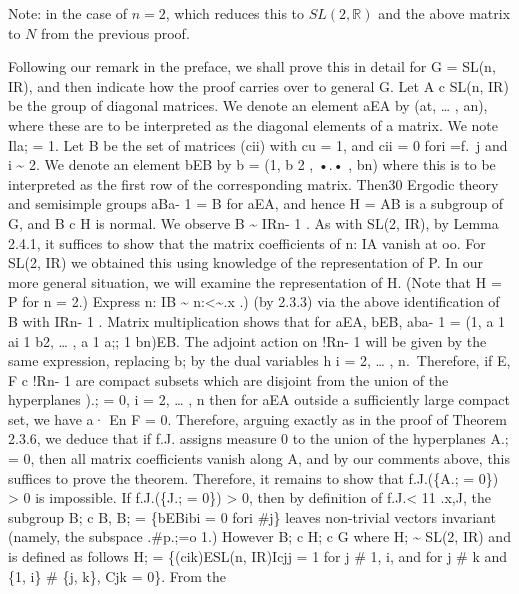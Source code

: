 \documentclass[
  12pt
]{article}
\theoremstyle{break}
\theoremstyle{plain}
\newcommand{\sltr}{\ensuremath{SL(2, \mathbb{R})}\xspace}
\begin{document}
  Note: in the case of $n = 2$, which reduces this to \sltr and the above matrix to $N$ from the previous proof.





   Following our remark in the preface, we shall
  prove this in detail for G = SL(n, IR), and then indicate how the proof
  carries over to general G. Let A c SL(n, IR) be the group of diagonal
  matrices. We denote an element aEA by (at, \ldots{} , an), where these
  are to be interpreted as the diagonal elements of a matrix. We note Ila;
  = 1. Let B be the set of matrices (cii) with cu = 1, and cii = 0 fori
  =f.~j and i \textasciitilde{} 2. We denote an element bEB by b = (1, b 2
  , •.• , bn) where this is to be interpreted as the first row of the
  corresponding matrix. Then30 Ergodic theory and semisimple groups aBa- 1
  = B for aEA, and hence H = AB is a subgroup of G, and B c H is normal.
  We observe B \textasciitilde{} IRn- 1 . As with SL(2, IR), by Lemma
  2.4.1, it suffices to show that the matrix coefficients of n: IA vanish
  at oo. For SL(2, IR) we obtained this using knowledge of the
  representation of P. In our more general situation, we will examine the
  representation of H. (Note that H = P for n = 2.) Express n: IB
  \textasciitilde{} n:\textless\textasciitilde.x .) (by 2.3.3) via the
  above identification of B with IRn- 1 . Matrix multiplication shows that
  for aEA, bEB, aba- 1 = (1, a 1 ai 1 b2, \ldots{} , a 1 a;; 1 bn)EB. The
  adjoint action on !Rn- 1 will be given by the same expression, replacing
  b; by the dual variables h i = 2, \ldots{} , n.~Therefore, if E, F c
  !Rn- 1 are compact subsets which are disjoint from the union of the
  hyperplanes ).; = 0, i = 2, \ldots{} , n then for aEA outside a
  sufficiently large compact set, we have a· En F = 0. Therefore, arguing
  exactly as in the proof of Theorem 2.3.6, we deduce that if f.J. assigns
  measure 0 to the union of the hyperplanes A.; = 0, then all matrix
  coefficients vanish along A, and by our comments above, this suffices to
  prove the theorem. Therefore, it remains to show that f.J.(\{A.; = 0\})
  \textgreater{} 0 is impossible. If f.J.(\{J.; = 0\}) \textgreater{} 0,
  then by definition of f.J.\textless{} 11 .x,J, the subgroup B; c B, B; =
  \{bEBibi = 0 fori \#j\} leaves non-trivial vectors invariant (namely,
  the subspace .\#p.;=o 1.) However B; c H; c G where H; \textasciitilde{}
  SL(2, IR) and is defined as follows H; = \{(cik)ESL(n, IR)Icjj = 1 for j
  \# 1, i, and for j \# k and \{1, i\} \# \{j, k\}, Cjk = 0\}. From the
\end{document}
